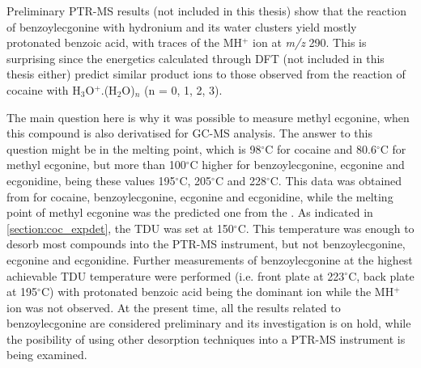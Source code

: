 Preliminary PTR-MS results (not included in this thesis) show that the reaction of benzoylecgonine with hydronium and its water clusters yield mostly protonated benzoic acid, with traces of the MH$^+$ ion at \textit{m/z} 290.
%
This is surprising since the energetics calculated through DFT (not included in this thesis either) predict similar product ions to those observed from the reaction of cocaine with H$_3$O$^+$.(H$_2$O)$_n$ (n = 0, 1, 2, 3).
%






The main question here is why it was possible to measure methyl ecgonine, when this compound is also derivatised for GC-MS analysis.
%
The answer to this question might be in the melting point, which is 98$^{\circ}$C for cocaine and 80.6$^{\circ}$C for methyl ecgonine, but more than 100$^{\circ}$C higher for benzoylecgonine, ecgonine and ecgonidine, being these values 195$^{\circ}$C, 205$^{\circ}$C and 228$^{\circ}$C.
%
This data was obtained from \citeauthor{haynes2014crc} for cocaine, benzoylecgonine, ecgonine and ecgonidine, while the melting point of methyl ecgonine was the predicted one from the \citeauthor{USAEPA} \cite{haynes2014crc,USAEPA}.
%
As indicated in \autoref{section:coc_expdet}, the TDU was set at 150$^{\circ}$C. This temperature was enough to desorb most compounds into the PTR-MS instrument, but not benzoylecgonine, ecgonine and ecgonidine.
%
Further measurements of benzoylecgonine at the highest achievable TDU temperature were performed (i.e. front plate at 223$^{\circ}$C, back plate at 195$^{\circ}$C) with protonated benzoic acid being the dominant ion while the MH$^+$ ion was not observed.
%
At the present time, all the results related to benzoylecgonine are considered preliminary and its investigation is on hold, while the posibility of using other desorption techniques into a PTR-MS instrument is being examined.

















